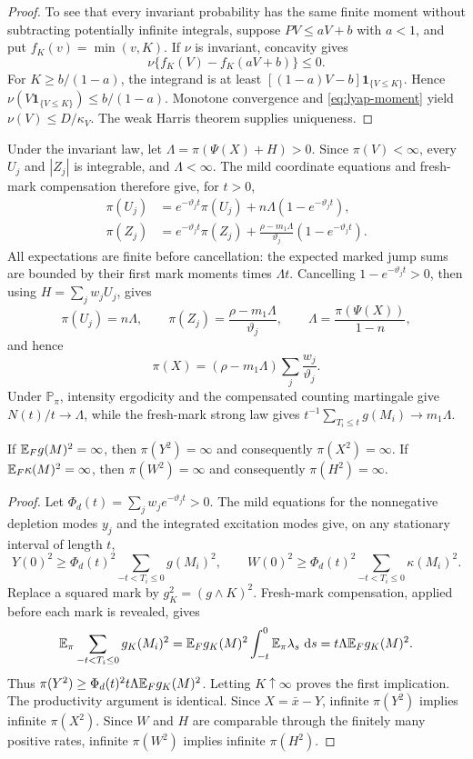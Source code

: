 \begin{proof}
To see that every invariant probability has the same finite moment without subtracting potentially infinite integrals, suppose \(PV\leq aV+b\) with \(a<1\), and put \(f_K(v)=\min(v,K)\). If \(\nu\) is invariant, concavity gives
\[
\nu\{f_K(V)-f_K(aV+b)\}\leq0.
\]
For \(K\geq b/(1-a)\), the integrand is at least
\([(1-a)V-b]\mathbf 1_{\{V\leq K\}}\). Hence
\(\nu(V\mathbf 1_{\{V\leq K\}})\leq b/(1-a)\). Monotone convergence and \eqref{eq:lyap-moment} yield \(\nu(V)\leq D/\kappa_V\). The weak Harris theorem supplies uniqueness.
\end{proof}

Under the invariant law, let \(\Lambda=\pi(\Psi(X)+H)>0\). Since \(\pi(V)<\infty\), every \(U_j\) and \(|Z_j|\) is integrable, and \(\Lambda<\infty\). The mild coordinate equations and fresh-mark compensation therefore give, for \(t>0\),
\[
\begin{aligned}
\pi(U_j)&=e^{-\vartheta_jt}\pi(U_j)
             +n\Lambda(1-e^{-\vartheta_jt}),\\
\pi(Z_j)&=e^{-\vartheta_jt}\pi(Z_j)
             +\frac{\rho-m_1\Lambda}{\vartheta_j}
               (1-e^{-\vartheta_jt}).
\end{aligned}
\]
All expectations are finite before cancellation: the expected marked jump sums are bounded by their first mark moments times \(\Lambda t\). Cancelling \(1-e^{-\vartheta_jt}>0\), then using \(H=\sum_jw_jU_j\), gives
\[
\pi(U_j)=n\Lambda,\qquad
\pi(Z_j)=\frac{\rho-m_1\Lambda}{\vartheta_j},\qquad
\Lambda=\frac{\pi(\Psi(X))}{1-n},
\]
and hence
\[
\pi(X)=(\rho-m_1\Lambda)\sum_j\frac{w_j}{\vartheta_j}.
\]
Under \(\mathbb P_\pi\), intensity ergodicity and the compensated counting martingale give \(N(t)/t\to\Lambda\), while the fresh-mark strong law gives \(t^{-1}\sum_{T_i\leq t}g(M_i)\to m_1\Lambda\).

\begin{proposition}\label{prop:heavy-moments}
If \(\mathbb{E} _Fg(M)^2=\infty\), then \(\pi(Y^2)=\infty\) and consequently \(\pi(X^2)=\infty\). If \(\mathbb{E} _F\kappa(M)^2=\infty\), then \(\pi(W^2)=\infty\) and consequently \(\pi(H^2)=\infty\).
\end{proposition}

\begin{proof}
Let \(\Phi_d(t)=\sum_jw_je^{-\vartheta_jt}>0\). The mild equations for the nonnegative depletion modes \(y_j\) and the integrated excitation modes give, on any stationary interval of length \(t\),
\[
Y(0)^2\geq\Phi_d(t)^2\sum_{-t<T_i\leq0}g(M_i)^2,
\qquad
W(0)^2\geq\Phi_d(t)^2\sum_{-t<T_i\leq0}\kappa(M_i)^2.
\]
Replace a squared mark by \(g_K^2=(g\wedge K)^2\). Fresh-mark compensation, applied before each mark is revealed, gives
\[
\mathbb{E} _\pi\sum_{-t<T_i\leq0}g_K(M_i)^2
=\mathbb{E} _Fg_K(M)^2\int_{-t}^0\mathbb{E} _\pi\lambda_s\,\mathop{}\!\mathrm{d} s
=t\Lambda\mathbb{E} _Fg_K(M)^2.
\]
Thus
\(\pi(Y^2)\geq\Phi_d(t)^2t\Lambda\mathbb{E} _Fg_K(M)^2\).
Letting \(K\uparrow\infty\) proves the first implication. The productivity argument is identical. Since \(X=\bar x-Y\), infinite \(\pi(Y^2)\) implies infinite \(\pi(X^2)\). Since \(W\) and \(H\) are comparable through the finitely many positive rates, infinite \(\pi(W^2)\) implies infinite \(\pi(H^2)\).
\end{proof}

